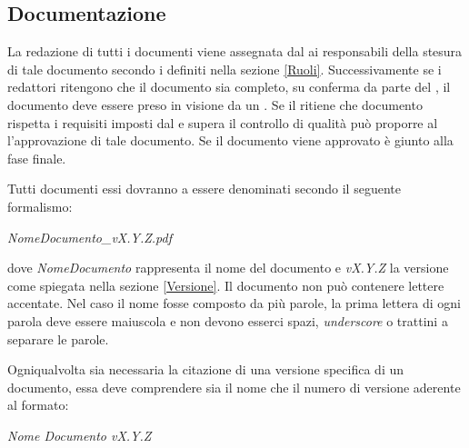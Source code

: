 \documentclass[12pt,a4paper]{article}
\begin{document}
\subsection{Documentazione}\label{Documentazione} %
La redazione di tutti i documenti viene assegnata dal \PM{} ai responsabili della stesura di tale documento secondo i  definiti nella sezione \ref{Ruoli}. Successivamente se i redattori ritengono che il documento sia completo, su conferma da parte del \PM, il documento deve essere preso in visione da un \VR. Se il \VR{} ritiene che documento rispetta i requisiti imposti dal \PR{} e supera il controllo di qualità può proporre al \PM{} l'approvazione di tale documento. Se il documento viene approvato è giunto alla fase finale.

Tutti documenti essi dovranno a essere denominati secondo il seguente formalismo:
\begin{center}
\emph{NomeDocumento\_vX.Y.Z.pdf}
\end{center}
dove \emph{NomeDocumento} rappresenta il nome del documento e \emph{vX.Y.Z} la versione come spiegata nella sezione \ref{Versione}. Il documento non può contenere lettere accentate. Nel caso il nome fosse composto da più parole, la prima lettera di ogni parola deve essere maiuscola e non devono esserci spazi, \emph{underscore} o trattini a separare le parole.

Ogniqualvolta sia necessaria la citazione di una versione specifica di un documento, essa deve comprendere sia il nome che il numero di versione aderente al formato:
\begin{center}
\emph{Nome Documento vX.Y.Z}
\end{center}
\end{document}
